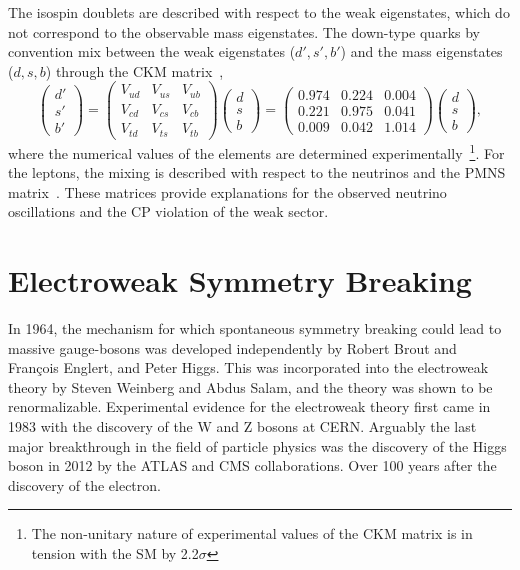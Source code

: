The isospin doublets are described with respect to the weak eigenstates, which do not correspond to the observable mass eigenstates.
The down-type quarks by convention mix between the weak eigenstates ($d', s', b'$) and the mass eigenstates ($d, s, b$) through the CKM matrix~\cite{cabibbo1963},
\begin{equation}
	\label{eq:ckm_matrix}
	\begin{pmatrix} d' \\ s' \\ b' \end{pmatrix} =
	\begin{pmatrix} V_{ud} & V_{us} & V_{ub} \\ V_{cd} & V_{cs} & V_{cb} \\ V_{td} & V_{ts} & V_{tb} \end{pmatrix} \begin{pmatrix} d \\ s \\ b \end{pmatrix} =
	\begin{pmatrix} 0.974 & 0.224 & 0.004 \\ 0.221 & 0.975 & 0.041 \\ 0.009 & 0.042 & 1.014 \end{pmatrix} \begin{pmatrix} d \\ s \\ b \end{pmatrix},
\end{equation}
where the numerical values of the elements are determined experimentally~\cite{ParticleDataGroup}\footnote{The non-unitary nature of experimental values of the CKM matrix is in tension with the SM by 2.2$\sigma$}.
For the leptons, the mixing is described with respect to the neutrinos and the PMNS matrix~\cite{PMNSMatrix}.
These matrices provide explanations for the observed neutrino oscillations and the CP violation of the weak sector.

\section{Electroweak Symmetry Breaking}
\label{sec:higgs}

In 1964, the mechanism for which spontaneous symmetry breaking could lead to massive gauge-bosons was developed independently by Robert Brout and François Englert, and Peter Higgs.
This was incorporated into the electroweak theory by Steven Weinberg and Abdus Salam, and the theory was shown to be renormalizable.
Experimental evidence for the electroweak theory first came in 1983 with the discovery of the W and Z bosons at CERN\@.
Arguably the last major breakthrough in the field of particle physics was the discovery of the Higgs boson in 2012 by the ATLAS and CMS collaborations.
Over 100 years after the discovery of the electron.

